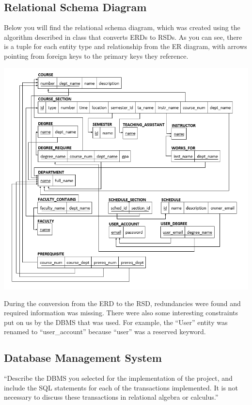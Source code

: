 \documentclass[twoside=false,a4paper,11pt]{article}
\theoremstyle{mytheor}
\begin{document}
\subsection*{Relational Schema Diagram}

Below you will find the relational schema diagram, which was created using the algorithm described in class that converts ERDs to RSDs. As you can see, there is a tuple for each entity type and relationship from the ER diagram, with arrows pointing from foreign keys to the primary keys they reference.

\includegraphics[width=\textwidth]{RelationalSchemaDiagram.png}

During the conversion from the ERD to the RSD, redundancies were found and required information was missing. There were also some interesting constraints put on us by the DBMS that was used. For example, the ``User'' entity was renamed to ``user\_account'' because ``user'' was a reserved keyword.

\subsection*{Database Management System}

``Describe the DBMS you selected for the implementation	of the project, and include the SQL statements for each of the transactions implemented. It is not necessary to discuss these transactions in relational algebra or calculus.''
\end{document}
